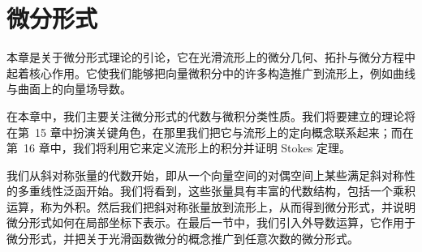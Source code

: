 \documentclass[../main.tex]{subfiles}
\begin{document}
\chapter{微分形式}\label{chapter:ch14-differential-forms}

本章是关于微分形式理论的引论，它在光滑流形上的微分几何、拓扑与微分方程中起着核心作用。它使我们能够把向量微积分中的许多构造推广到流形上，例如曲线与曲面上的向量场导数。

在本章中，我们主要关注微分形式的代数与微积分类性质。我们将要建立的理论将在第~15 章中扮演关键角色，在那里我们把它与流形上的定向概念联系起来；而在第~16 章中，我们将利用它来定义流形上的积分并证明 Stokes 定理。

我们从斜对称张量的代数开始，即从一个向量空间的对偶空间上某些满足斜对称性的多重线性泛函开始。我们将看到，这些张量具有丰富的代数结构，包括一个乘积运算，称为外积。然后我们把斜对称张量放到流形上，从而得到微分形式，并说明微分形式如何在局部坐标下表示。在最后一节中，我们引入外导数运算，它作用于微分形式，并把关于光滑函数微分的概念推广到任意次数的微分形式。





\end{document}

